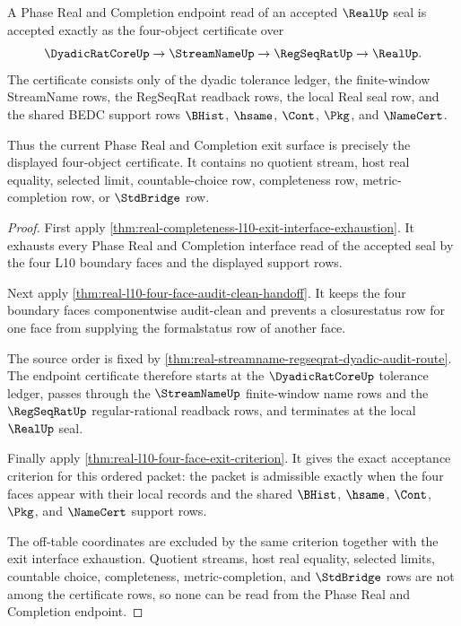 \begin{theorem}
\label{thm:real-l10-four-object-phase-exit-certificate}
A Phase Real and Completion endpoint read of an accepted $\RealUp$ seal is accepted exactly as the four-object certificate over
$$
\DyadicRatCoreUp \to \StreamNameUp \to \RegSeqRatUp \to \RealUp.
$$
The certificate consists only of the dyadic tolerance ledger, the finite-window StreamName rows, the RegSeqRat readback rows, the local Real seal row, and the shared BEDC support rows $\BHist$, $\hsame$, $\Cont$, $\Pkg$, and $\NameCert$.

Thus the current Phase Real and Completion exit surface is precisely the displayed four-object certificate. It contains no quotient stream, host real equality, selected limit, countable-choice row, completeness row, metric-completion row, or $\StdBridge$ row.
\end{theorem}
\begin{proof}
First apply \autoref{thm:real-completeness-l10-exit-interface-exhaustion}. It exhausts every Phase Real and Completion interface read of the accepted seal by the four L10 boundary faces and the displayed support rows.

Next apply \autoref{thm:real-l10-four-face-audit-clean-handoff}. It keeps the four boundary faces componentwise audit-clean and prevents a closurestatus row for one face from supplying the formalstatus row of another face.

The source order is fixed by \autoref{thm:real-streamname-regseqrat-dyadic-audit-route}. The endpoint certificate therefore starts at the $\DyadicRatCoreUp$ tolerance ledger, passes through the $\StreamNameUp$ finite-window name rows and the $\RegSeqRatUp$ regular-rational readback rows, and terminates at the local $\RealUp$ seal.

Finally apply \autoref{thm:real-l10-four-face-exit-criterion}. It gives the exact acceptance criterion for this ordered packet: the packet is admissible exactly when the four faces appear with their local records and the shared $\BHist$, $\hsame$, $\Cont$, $\Pkg$, and $\NameCert$ support rows.

The off-table coordinates are excluded by the same criterion together with the exit interface exhaustion. Quotient streams, host real equality, selected limits, countable choice, completeness, metric-completion, and $\StdBridge$ rows are not among the certificate rows, so none can be read from the Phase Real and Completion endpoint.
\end{proof}

